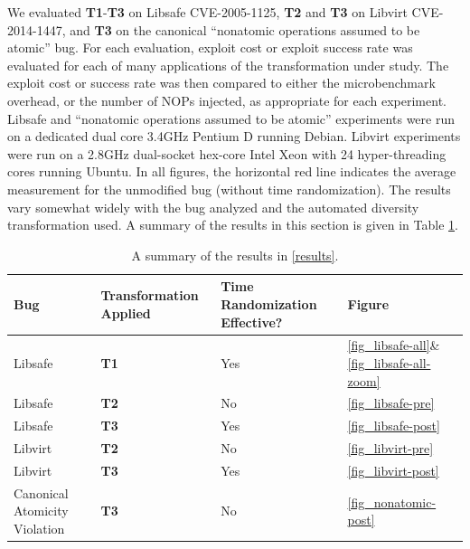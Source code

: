 We evaluated \textbf{T1}-\textbf{T3} on Libsafe CVE-2005-1125, \textbf{T2} and \textbf{T3} on Libvirt CVE-2014-1447, and \textbf{T3} on the canonical ``nonatomic operations assumed to be atomic'' bug.
For each evaluation, exploit cost or exploit success rate was evaluated for each of many applications of the transformation under study.
The exploit cost or success rate was then compared to either the microbenchmark overhead, or the number of NOPs injected, as appropriate for each experiment.
Libsafe and ``nonatomic operations assumed to be atomic'' experiments were run on a dedicated dual core 3.4GHz Pentium D running Debian.
Libvirt experiments were run on a 2.8GHz dual-socket hex-core Intel Xeon with 24 hyper-threading cores running Ubuntu.
In all figures, the horizontal red line indicates the average measurement for the unmodified bug (without time randomization).
The results vary somewhat widely with the bug analyzed and the automated diversity transformation used.
A summary of the results in this section is given in Table \ref{tab_results}.
\begin{table}
	\centering
	\begin{tabular}{ | p{0.6in} | p{0.6in} | p{0.6in} | p{0.6in} | }
	\hline
	Bug & Transfor\-mation Applied & Time Randomization Effective? & Figure \\ \hline
	\hline
	Libsafe & \textbf{T1} & Yes & \ref{fig_libsafe-all}\&\ref{fig_libsafe-all-zoom} \\ \hline
	Libsafe & \textbf{T2} & No & \ref{fig_libsafe-pre} \\ \hline
	Libsafe & \textbf{T3} & Yes & \ref{fig_libsafe-post} \\ \hline
	Libvirt & \textbf{T2} & No & \ref{fig_libvirt-pre} \\ \hline
	Libvirt & \textbf{T3} & Yes & \ref{fig_libvirt-post} \\ \hline
	Canonical Atomicity Violation & \textbf{T3} & No & \ref{fig_nonatomic-post} \\ \hline
	\end{tabular}
	\caption{A summary of the results in \autoref{results}.}
	\label{tab_results}
\end{table}

